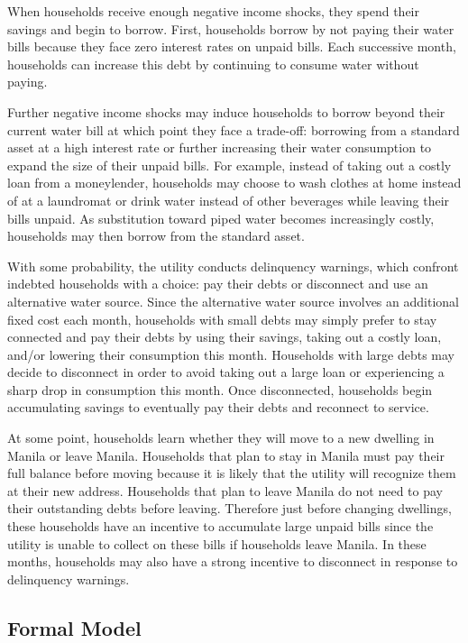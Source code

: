 \documentclass[12pt]{article}
\begin{document}
When households receive enough negative income shocks, they spend their savings and begin to borrow.  First, households borrow by not paying their water bills because they face zero interest rates on unpaid bills.  Each successive month, households can increase this debt by continuing to consume water without paying.

Further negative income shocks may induce households to borrow beyond their current water bill at which point they face a trade-off: borrowing from a standard asset at a high interest rate or further increasing their water consumption to expand the size of their unpaid bills.  For example, instead of taking out a costly loan from a moneylender, households may choose to wash clothes at home instead of at a laundromat or drink water instead of other beverages while leaving their bills unpaid.  As substitution toward piped water becomes increasingly costly, households may then borrow from the standard asset.

With some probability, the utility conducts delinquency warnings, which confront indebted households with a choice: pay their debts or disconnect and use an alternative water source.  Since the alternative water source involves an additional fixed cost each month, households with small debts may simply prefer to stay connected and pay their debts by using their savings, taking out a costly loan, and/or lowering their consumption this month.  Households with large debts may decide to disconnect in order to avoid taking out a large loan or experiencing a sharp drop in consumption this month.  Once disconnected, households begin accumulating savings to eventually pay their debts and reconnect to service.

At some point, households learn whether they will move to a new dwelling in Manila or leave Manila.  Households that plan to stay in Manila must pay their full balance before moving because it is likely that the utility will recognize them at their new address.  Households that plan to leave Manila do not need to pay their outstanding debts before leaving.  Therefore just before changing dwellings, these households have an incentive to accumulate large unpaid bills since the utility is unable to collect on these bills if households leave Manila.  In these months, households may also have a strong incentive to disconnect in response to delinquency warnings.

\subsection{Formal Model}\label{section:formalmodel}
\end{document}

